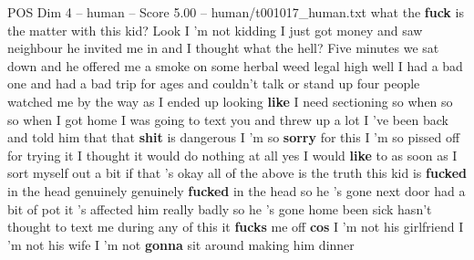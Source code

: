 \begin{textsample}{POS Dim 4 – human – Score 5.00 – human/t001017\_human.txt}  \label{ex:f4_pos_002}
what the \textbf{fuck} is the matter with this kid?
Look I 'm not kidding I just got money and saw neighbour he invited me in and I thought what the hell?
Five minutes we sat down and he offered me a smoke on some herbal weed legal high well I had a bad one and had a bad trip for ages and couldn't talk or stand up four people watched me by the way as I ended up looking \textbf{like} I need sectioning so when so so when I got home I was going to text you and threw up a lot I 've been back and told him that that \textbf{shit} is dangerous I 'm so \textbf{sorry} for this I 'm so pissed off for trying it I thought it would do nothing at all yes I would \textbf{like} to as soon as I sort myself out a bit if that 's okay all of the above is the truth this kid is \textbf{fucked} in the head genuinely genuinely \textbf{fucked} in the head so he 's gone next door had a bit of pot it 's affected him really badly so he 's gone home been sick hasn't thought to text me during any of this it \textbf{fucks} me off \textbf{cos} I 'm not his girlfriend I 'm not his wife I 'm not \textbf{gonna} sit around making him dinner

\end{textsample}
